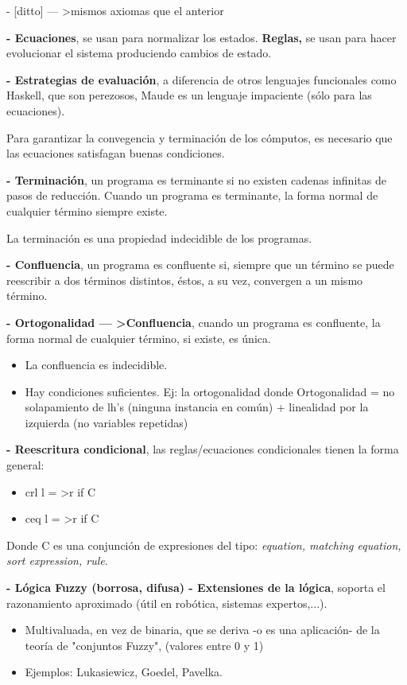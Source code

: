 \documentclass[12pt]{amsart}
\begin{document}
    - [ditto] --- \textgreater mismos axiomas que el anterior

    \textbf{- Ecuaciones}, se usan para normalizar los estados.
    \textbf{Reglas,} se usan para hacer evolucionar el sistema
    produciendo cambios de estado.

    \textbf{- Estrategias de evaluación}, a diferencia de otros
    lenguajes funcionales como Haskell, que son perezosos, Maude es
    un lenguaje impaciente (sólo para las ecuaciones).

    Para garantizar la convegencia y terminación de los cómputos, es
    necesario que las ecuaciones satisfagan buenas condiciones.

    \textbf{- Terminación}, un programa es terminante si no existen
    cadenas infinitas de pasos de reducción. Cuando un programa
    es terminante, la forma normal de cualquier término siempre existe.
    
    La terminación es una propiedad indecidible de los programas.

    \textbf{- Confluencia}, un programa es confluente si, siempre
    que un término se puede reescribir a dos términos distintos,
    éstos, a su vez, convergen a un mismo término.

    \textbf{- Ortogonalidad --- \textgreater Confluencia}, cuando un
    programa es confluente, la forma normal de cualquier término,
    si existe, es única. 
    \begin{itemize}
        \item La confluencia es indecidible.
        \item Hay condiciones suficientes. Ej: la ortogonalidad donde
        Ortogonalidad = no solapamiento de lh's (ninguna instancia en común)
         + linealidad por la izquierda (no variables repetidas)
    \end{itemize}

    \textbf{- Reescritura condicional}, las reglas/ecuaciones
    condicionales tienen la forma general: 
    \begin{itemize}
        \item crl l = \textgreater r if C
        \item ceq l = \textgreater r if C
    \end{itemize}

    Donde C es una conjunción de expresiones del tipo: \emph{equation,
    matching equation, sort expression, rule}.
    
    \textbf{- Lógica Fuzzy (borrosa, difusa) - Extensiones de la lógica},
    soporta el razonamiento aproximado (útil en robótica, sistemas expertos,...).
    \begin{itemize}
        \item Multivaluada, en vez de binaria, que se deriva -o es una
        aplicación- de la teoría de "conjuntos Fuzzy", (valores entre 0 y 1)
        \item Ejemplos: Lukasiewicz, Goedel, Pavelka.
    \end{itemize}
\end{document}
